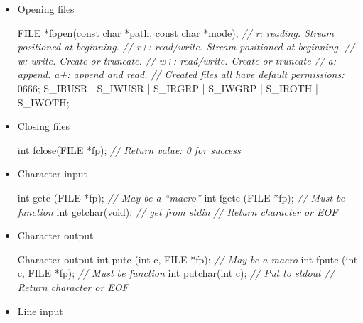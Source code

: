 \documentclass[]{article}
\newenvironment{Shaded}{}{}
\newcommand{\DataTypeTok}[1]{\textcolor[rgb]{0.56,0.13,0.00}{#1}}
\newcommand{\DecValTok}[1]{\textcolor[rgb]{0.25,0.63,0.44}{#1}}
\newcommand{\CommentTok}[1]{\textcolor[rgb]{0.38,0.63,0.69}{\textit{#1}}}
\newcommand{\NormalTok}[1]{#1}
\begin{document}
\begin{itemize}
\item
  Opening files

\begin{Shaded}
\begin{Highlighting}[]
\NormalTok{FILE *fopen(}\DataTypeTok{const} \DataTypeTok{char}\NormalTok{ *path, }\DataTypeTok{const} \DataTypeTok{char}\NormalTok{ *mode);}
\CommentTok{// r: 	reading. Stream positioned at beginning.}
\CommentTok{// r+: read/write. Stream positioned at beginning.}
\CommentTok{// w: 	write. Create or truncate.}
\CommentTok{// w+: read/write. Create or truncate}
\CommentTok{// a: 	append. a+: append and read.}
\CommentTok{// Created files all have default permissions:}
\DecValTok{0666}\NormalTok{;}
\NormalTok{S_IRUSR | S_IWUSR | S_IRGRP | S_IWGRP | S_IROTH | S_IWOTH;}
\end{Highlighting}
\end{Shaded}
\item
  Closing files

\begin{Shaded}
\begin{Highlighting}[]
\DataTypeTok{int}\NormalTok{ fclose(FILE *fp);}
\CommentTok{// Return value: 0 for success}
\end{Highlighting}
\end{Shaded}
\item
  Character input

\begin{Shaded}
\begin{Highlighting}[]
\DataTypeTok{int}\NormalTok{ getc (FILE *fp);		}\CommentTok{// May be a “macro”}
\DataTypeTok{int}\NormalTok{ fgetc (FILE *fp); 		}\CommentTok{// Must be function}
\DataTypeTok{int}\NormalTok{ getchar(}\DataTypeTok{void}\NormalTok{);			}\CommentTok{// get from stdin}
\CommentTok{// Return character or EOF}
\end{Highlighting}
\end{Shaded}
\item
  Character output

\begin{Shaded}
\begin{Highlighting}[]
\NormalTok{Character output}
\DataTypeTok{int}\NormalTok{ putc (}\DataTypeTok{int}\NormalTok{ c, FILE *fp); 	}\CommentTok{// May be a macro}
\DataTypeTok{int}\NormalTok{ fputc (}\DataTypeTok{int}\NormalTok{ c, FILE *fp);	}\CommentTok{// Must be function}
\DataTypeTok{int}\NormalTok{ putchar(}\DataTypeTok{int}\NormalTok{ c);				}\CommentTok{// Put to stdout}
\CommentTok{// Return character or EOF}
\end{Highlighting}
\end{Shaded}
\item
  Line input


\end{itemize}
\end{document}
